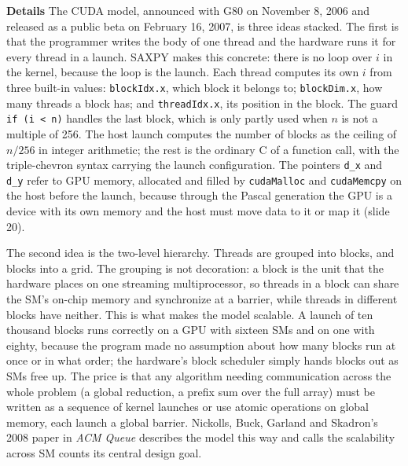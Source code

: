 \documentclass[11pt,letterpaper]{article}
\newcommand{\para}[1]{\medskip\noindent\textbf{#1}\quad}
\begin{document}
\para{Details} The CUDA model, announced with G80 on November 8, 2006 and released as a public beta on February 16, 2007, is three ideas stacked. The first is that the programmer writes the body of one thread and the hardware runs it for every thread in a launch. SAXPY makes this concrete: there is no loop over $i$ in the kernel, because the loop is the launch. Each thread computes its own $i$ from three built-in values: \texttt{blockIdx.x}, which block it belongs to; \texttt{blockDim.x}, how many threads a block has; and \texttt{threadIdx.x}, its position in the block. The guard \texttt{if (i < n)} handles the last block, which is only partly used when $n$ is not a multiple of 256. The host launch computes the number of blocks as the ceiling of $n/256$ in integer arithmetic; the rest is the ordinary C of a function call, with the triple-chevron syntax carrying the launch configuration. The pointers \texttt{d\_x} and \texttt{d\_y} refer to GPU memory, allocated and filled by \texttt{cudaMalloc} and \texttt{cudaMemcpy} on the host before the launch, because through the Pascal generation the GPU is a device with its own memory and the host must move data to it or map it (slide 20).

The second idea is the two-level hierarchy. Threads are grouped into blocks, and blocks into a grid. The grouping is not decoration: a block is the unit that the hardware places on one streaming multiprocessor, so threads in a block can share the SM's on-chip memory and synchronize at a barrier, while threads in different blocks have neither. This is what makes the model scalable. A launch of ten thousand blocks runs correctly on a GPU with sixteen SMs and on one with eighty, because the program made no assumption about how many blocks run at once or in what order; the hardware's block scheduler simply hands blocks out as SMs free up. The price is that any algorithm needing communication across the whole problem (a global reduction, a prefix sum over the full array) must be written as a sequence of kernel launches or use atomic operations on global memory, each launch a global barrier. Nickolls, Buck, Garland and Skadron's 2008 paper in \emph{ACM Queue} describes the model this way and calls the scalability across SM counts its central design goal.
\end{document}
